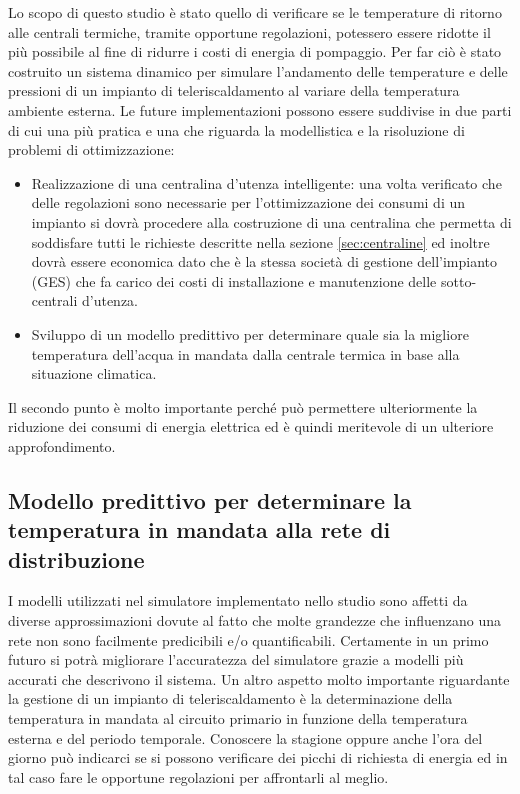 \documentclass[laurea,oneside,11pt]{USiena_tesiLM}
\begin{document}
Lo scopo di questo studio è stato quello di verificare se le temperature di ritorno alle centrali termiche, tramite opportune regolazioni, potessero essere ridotte il più possibile al fine di ridurre i costi di energia di pompaggio. Per far ciò è stato costruito un sistema dinamico per simulare l'andamento delle temperature e delle pressioni di un impianto di teleriscaldamento al variare della temperatura ambiente esterna. Le future implementazioni possono essere suddivise in due parti di cui una più pratica e una che riguarda la modellistica e la risoluzione di problemi di ottimizzazione: 
\begin{itemize}
\item  Realizzazione di una centralina d'utenza intelligente: una volta verificato che delle regolazioni sono necessarie per l'ottimizzazione dei consumi di un impianto si dovrà procedere alla costruzione di una centralina che permetta di soddisfare tutti le richieste descritte nella sezione \ref{sec:centraline} ed inoltre dovrà essere economica dato che è la stessa società  di gestione dell'impianto (GES) che fa carico dei costi di installazione e manutenzione delle sotto-centrali d'utenza.
\item Sviluppo di un modello predittivo per determinare quale sia la migliore temperatura dell'acqua in mandata dalla centrale termica in base alla situazione climatica.
\end{itemize}
Il secondo punto è molto importante perché può permettere ulteriormente la riduzione dei consumi di energia elettrica ed è quindi meritevole di un ulteriore approfondimento. 
 
\subsection{Modello predittivo per determinare la temperatura in mandata alla rete di distribuzione}
I modelli utilizzati nel simulatore implementato nello studio sono affetti da diverse approssimazioni dovute al fatto che molte grandezze che influenzano una rete non sono facilmente predicibili e/o quantificabili.
Certamente in un primo futuro si potrà migliorare l'accuratezza del simulatore grazie a modelli più accurati che descrivono il sistema. 
Un altro aspetto molto importante riguardante la gestione di un impianto di teleriscaldamento è la determinazione della temperatura in mandata al circuito primario in funzione della temperatura esterna e del periodo temporale. Conoscere la stagione oppure anche l'ora del giorno può indicarci se si possono verificare dei picchi di richiesta di energia ed in tal caso fare le opportune regolazioni per affrontarli al meglio.
\end{document}
